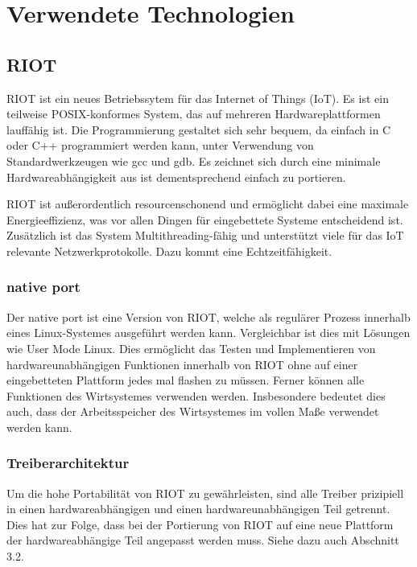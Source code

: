 \section{Verwendete Technologien}

\subsection{RIOT}
RIOT \autocite{website:riotos} ist ein neues Betriebssytem für das Internet of Things (IoT).
Es ist ein teilweise POSIX-konformes System, das auf mehreren Hardwareplattformen lauffähig ist.
Die Programmierung gestaltet sich sehr bequem, da einfach in C oder C++ programmiert werden kann, unter Verwendung von Standardwerkzeugen wie gcc und gdb.
Es zeichnet sich durch eine minimale Hardwareabhängigkeit aus ist dementsprechend einfach zu portieren.

RIOT ist außerordentlich resourcenschonend und ermöglicht dabei eine maximale Energieeffizienz, was vor allen Dingen für eingebettete Systeme entscheidend ist.
Zusätzlich ist das System Multithreading-fähig und unterstützt viele für das IoT relevante Netzwerkprotokolle. Dazu kommt eine Echtzeitfähigkeit.

\subsubsection{native port}
\label{section:native_port}
Der native port ist eine Version von RIOT, welche als regulärer Prozess innerhalb eines Linux-Systemes ausgeführt werden kann.
Vergleichbar ist dies mit Lösungen wie User Mode Linux.
Dies ermöglicht das Testen und Implementieren von hardwareunabhängigen Funktionen innerhalb von RIOT ohne auf einer eingebetteten Plattform jedes mal flashen zu müssen.
Ferner können alle Funktionen des Wirtsystemes verwenden werden.
Insbesondere bedeutet dies auch, dass der Arbeitsspeicher des Wirtsystemes im vollen Maße verwendet werden kann.

\subsubsection{Treiberarchitektur}
Um die hohe Portabilität von RIOT zu gewährleisten, sind alle Treiber prizipiell in einen hardwareabhängigen und einen hardwareunabhängigen Teil getrennt.
Dies hat zur Folge, dass bei der Portierung von RIOT auf eine neue Plattform der hardwareabhängige Teil angepasst werden muss.
Siehe dazu auch Abschnitt 3.2. %

